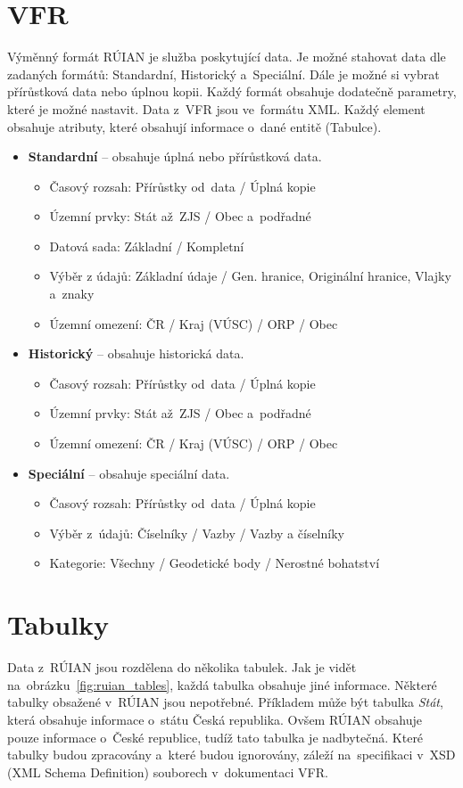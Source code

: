 \documentclass[czech, kiv, ba, he, iso690auyr, pdf]{fasthesis}
\begin{document}
\section{VFR}
Výměnný formát RÚIAN je služba poskytující data.
Je možné stahovat data dle zadaných formátů: Standardní, Historický a~Speciální.
Dále je možné si vybrat přírůstková data nebo úplnou kopii.
Každý formát obsahuje dodatečně parametry, které je možné nastavit.
Data z~VFR jsou ve~formátu XML.
Každý element obsahuje atributy, které obsahují informace o~dané entitě (Tabulce).
\newpage
\begin {itemize}
    \item \textbf{Standardní} -- obsahuje úplná nebo přírůstková data.
    \begin {itemize}
        \item Časový rozsah: Přírůstky od~data / Úplná kopie
        \item Územní prvky: Stát až~ZJS / Obec a~podřadné
        \item Datová sada: Základní / Kompletní
        \item Výběr z údajů: Základní údaje / Gen. hranice, Originální hranice, Vlajky a~znaky
        \item Územní omezení: ČR / Kraj (VÚSC) / ORP / Obec
    \end {itemize}
    \item \textbf{Historický} -- obsahuje historická data.
    \begin {itemize}
        \item Časový rozsah: Přírůstky od~data / Úplná kopie
        \item Územní prvky: Stát až~ZJS / Obec a~podřadné
        \item Územní omezení: ČR / Kraj (VÚSC) / ORP / Obec
    \end {itemize}
    \item \textbf{Speciální} -- obsahuje speciální data.
    \begin {itemize}
        \item Časový rozsah: Přírůstky od~data / Úplná kopie
        \item Výběr z~údajů: Číselníky / Vazby / Vazby a číselníky
        \item Kategorie: Všechny / Geodetické body / Nerostné bohatství
    \end {itemize}
\end {itemize}

\section{Tabulky}
Data z~RÚIAN jsou rozdělena do několika tabulek.
Jak je vidět na~obrázku~\ref{fig:ruian_tables}, každá tabulka obsahuje jiné informace.
Některé tabulky obsažené v~RÚIAN jsou nepotřebné. 
Příkladem může být tabulka \textit{Stát}, která obsahuje informace o~státu Česká republika.
Ovšem RÚIAN obsahuje pouze informace o~České republice, tudíž tato tabulka je nadbytečná.
Které tabulky budou zpracovány a~které budou ignorovány, záleží na~specifikaci 
v~XSD (XML Schema Definition) souborech v~dokumentaci VFR. 
\newpage
\end{document}
